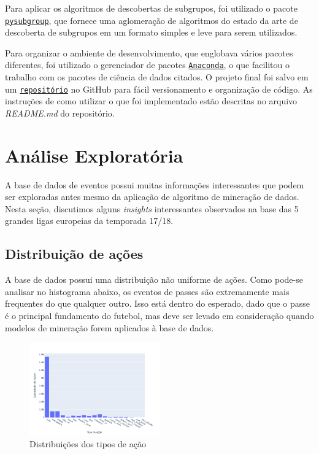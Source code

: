 \documentclass{article}
\begin{document}
Para aplicar os algoritmos de descobertas de subgrupos, foi utilizado o pacote
\href{https://pysubgroup.readthedocs.io/en/latest/}{\texttt{pysubgroup}}, que
fornece uma aglomeração de algoritmos do estado da arte de descoberta de
subgrupos em um formato simples e leve para serem utilizados.


Para organizar o ambiente de desenvolvimento, que englobava vários pacotes
diferentes, foi utilizado o gerenciador de pacotes
\href{https://www.anaconda.com/}{\texttt{Anaconda}}, o que facilitou o trabalho
com os pacotes de ciência de dados citados. O projeto final foi salvo em um
\href{https://github.com/lframosferreira/projeto-ad}{\texttt{repositório}}
no GitHub para fácil versionamento e organização de código. As instruções de
como
utilizar o que foi implementado estão descritas no arquivo \textit{README.md}
do repositório.

\section{Análise Exploratória}

A base de dados de eventos possui muitas informações interessantes que podem
ser exploradas antes mesmo da aplicação
de algoritmo de mineração de dados. Nesta seção, discutimos alguns
\textit{insights} interessantes observados na base das 5 grandes ligas
europeias da temporada 17/18.

\subsection{Distribuição de ações}

A base de dados possui uma distribuição não uniforme de ações. Como pode-se
analisar no histograma abaixo, os eventos de passes são extremamente mais
frequentes do que qualquer outro. Isso está dentro do esperado, dado que o
passe é o principal fundamento do futebol, mas deve ser levado em consideração
quando modelos de mineração forem aplicados à base de dados.

\begin{figure}[H]
    \centering
    \includegraphics[width=0.5\textwidth]{images/action_distribution.png}
    \caption{Distribuições dos tipos de ação}
    \label{fig:action_distribution}
\end{figure}
\end{document}
